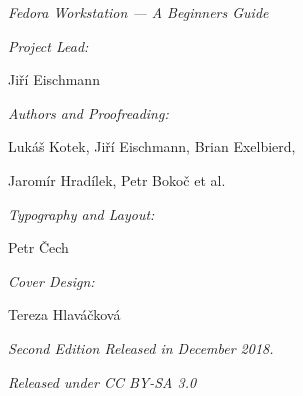 \newpage\mbox{}\newpage
\begin{center}

\emph{\large Fedora Workstation --- A Beginners Guide}

\bigskip

\emph{Project Lead:}

Jiří Eischmann

\medskip

\emph{Authors and Proofreading:}

Lukáš Kotek, Jiří Eischmann, Brian Exelbierd,

Jaromír Hradílek, Petr Bokoč et al.

\medskip

\emph{Typography and Layout:}

Petr Čech

\medskip

\emph{Cover Design:}

Tereza Hlaváčková

\medskip

\emph{Second Edition Released in December 2018.}

\emph{Released under CC BY-SA 3.0}
\end{center}
